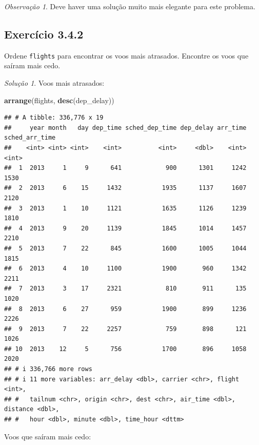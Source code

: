 \documentclass[
]{latex/krantz}
\newenvironment{Shaded}{\begin{snugshade}}{\end{snugshade}}
\newcommand{\FunctionTok}[1]{\textcolor[rgb]{0.13,0.29,0.53}{\textbf{#1}}}
\newcommand{\NormalTok}[1]{#1}
\theoremstyle{definition}
\theoremstyle{definition}
\theoremstyle{definition}
\theoremstyle{definition}
\theoremstyle{remark}
\newtheorem*{remark}{Observação}
\newtheorem*{solution}{Solução}
\begin{document}
\begin{remark}
Deve haver uma solução muito mais elegante para este problema.
\end{remark}

\hypertarget{exr3-4-2}{%
\subsection*{Exercício 3.4.2}\label{exr3-4-2}}

Ordene \texttt{flights} para encontrar os voos mais atrasados. Encontre os voos que saíram mais cedo.

\begin{solution}

Voos mais atrasados:

\begin{Shaded}
\begin{Highlighting}[]
\FunctionTok{arrange}\NormalTok{(flights, }\FunctionTok{desc}\NormalTok{(dep\_delay))}
\end{Highlighting}
\end{Shaded}

\begin{verbatim}
## # A tibble: 336,776 x 19
##     year month   day dep_time sched_dep_time dep_delay arr_time sched_arr_time
##    <int> <int> <int>    <int>          <int>     <dbl>    <int>          <int>
##  1  2013     1     9      641            900      1301     1242           1530
##  2  2013     6    15     1432           1935      1137     1607           2120
##  3  2013     1    10     1121           1635      1126     1239           1810
##  4  2013     9    20     1139           1845      1014     1457           2210
##  5  2013     7    22      845           1600      1005     1044           1815
##  6  2013     4    10     1100           1900       960     1342           2211
##  7  2013     3    17     2321            810       911      135           1020
##  8  2013     6    27      959           1900       899     1236           2226
##  9  2013     7    22     2257            759       898      121           1026
## 10  2013    12     5      756           1700       896     1058           2020
## # i 336,766 more rows
## # i 11 more variables: arr_delay <dbl>, carrier <chr>, flight <int>,
## #   tailnum <chr>, origin <chr>, dest <chr>, air_time <dbl>, distance <dbl>,
## #   hour <dbl>, minute <dbl>, time_hour <dttm>
\end{verbatim}

Voos que saíram mais cedo:


\end{solution}
\end{document}
